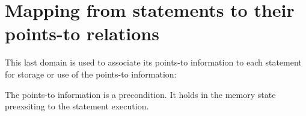 \documentclass{article}
\begin{document}
\section{Mapping from statements to their points-to relations}

This last domain is used to associate its points-to information to
each statement for storage or use of the points-to information:

{}

The points-to information is a precondition. It holds in the memory
state preexsiting to the statement execution.
\end{document}
